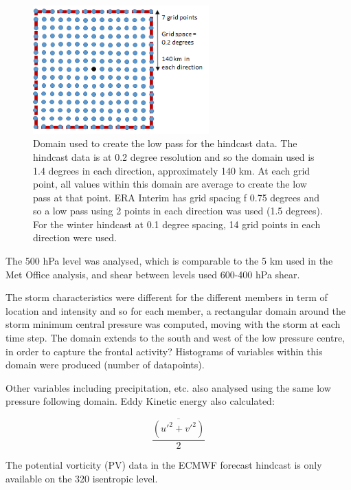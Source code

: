 \begin{figure}
	
	\includegraphics[width=16pc,angle=0]{low_pass.png}
	\caption{Domain used to create the low pass for the hindcast data.  The hindcast data is at 0.2 degree resolution and so the domain used is 1.4 degrees in each direction, approximately 140 km. At each grid point, all values within this domain are average to create the low pass at that point. ERA Interim has grid spacing f 0.75 degrees and so a low pass using 2 points in each direction was used (1.5 degrees). For the winter hindcast at 0.1 degree spacing, 14 grid points in each direction were used.}\label{fig:low_pass}
	\centering
\end{figure}


The 500 hPa level was analysed, which is comparable to the 5 km used in the Met Office analysis, and shear between levels used 600-400 hPa shear.

The storm characteristics were different for the different members in term of location and intensity and so for each member, a rectangular domain around the storm minimum central pressure was computed, moving with the storm at each time step. The domain extends to the south and west of the low pressure centre, in order to capture the frontal activity?
Histograms of variables within this domain were produced (number of datapoints).

Other variables including precipitation, etc. also analysed using the same low pressure following domain.
Eddy Kinetic energy also calculated:

\begin{equation} \label{eq_EKE}
\frac{\overline{(u'^{2}+v'^{2})}}{2} 
\end{equation}

The potential vorticity (PV) data in the ECMWF forecast hindcast is only available on the 320 isentropic level. 

